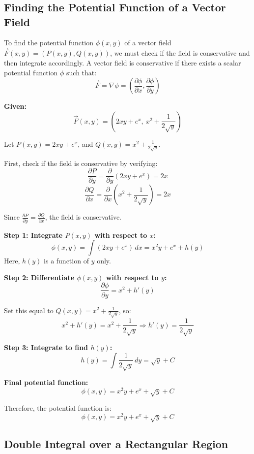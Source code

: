\subsection{Finding the Potential Function of a Vector Field}

To find the potential function \( \phi(x, y) \) of a vector field \( \vec{F}(x, y) = (P(x, y), Q(x, y)) \), we must check if the field is conservative and then integrate accordingly. A vector field is conservative if there exists a scalar potential function \( \phi \) such that:
\[
\vec{F} = \nabla \phi = \left( \frac{\partial \phi}{\partial x}, \frac{\partial \phi}{\partial y} \right)
\]

\textbf{Given:}
\[
\vec{F}(x, y) = \left(2xy + e^x,\ x^2 + \frac{1}{2\sqrt{y}}\right)
\]

Let \( P(x, y) = 2xy + e^x \), and \( Q(x, y) = x^2 + \frac{1}{2\sqrt{y}} \).

First, check if the field is conservative by verifying:
\[
\frac{\partial P}{\partial y} = \frac{\partial}{\partial y}(2xy + e^x) = 2x
\]
\[
\frac{\partial Q}{\partial x} = \frac{\partial}{\partial x}\left(x^2 + \frac{1}{2\sqrt{y}}\right) = 2x
\]

Since \( \frac{\partial P}{\partial y} = \frac{\partial Q}{\partial x} \), the field is conservative.
\vspace{\baselineskip}

\textbf{Step 1: Integrate \( P(x, y) \) with respect to \( x \):}
\[
\phi(x, y) = \int (2xy + e^x)\,dx = x^2y + e^x + h(y)
\]
Here, \( h(y) \) is a function of \( y \) only.
\vspace{\baselineskip}

\textbf{Step 2: Differentiate \( \phi(x, y) \) with respect to \( y \):}
\[
\frac{\partial \phi}{\partial y} = x^2 + h'(y)
\]

Set this equal to \( Q(x, y) = x^2 + \frac{1}{2\sqrt{y}} \), so:
\[
x^2 + h'(y) = x^2 + \frac{1}{2\sqrt{y}} \Rightarrow h'(y) = \frac{1}{2\sqrt{y}}
\]

\textbf{Step 3: Integrate to find \( h(y) \):}
\[
h(y) = \int \frac{1}{2\sqrt{y}}\,dy = \sqrt{y} + C
\]

\textbf{Final potential function:}
\[
\phi(x, y) = x^2y + e^x + \sqrt{y} + C
\]

Therefore, the potential function is:
\[
\boxed{\phi(x, y) = x^2y + e^x + \sqrt{y} + C}
\]


\subsection{Double Integral over a Rectangular Region}


